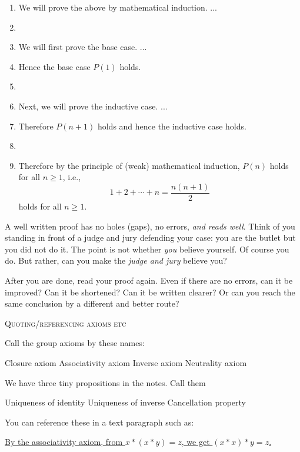\begin{enumerate}[nosep]
\item[] We will prove the above by mathematical induction. ...
\item[]
\item[] \hspace{1cm} We will first prove the base case. ...
\item[] \hspace{1cm} Hence the base case $P(1)$ holds.
\item[]
\item[] \hspace{1cm} Next, we will prove the inductive case. ...
\item[] \hspace{1cm} Therefore $P(n+1)$ holds and hence the inductive case holds.
\item[] 
\item[] Therefore by the principle of (weak) mathematical induction,
$P(n)$ holds for all $n \geq 1$, i.e.,
\[
1 + 2 + \cdots + n = \frac{n(n+1)}{2}
\]
holds for all $n \geq 1$.
\end{enumerate}

A well written proof has no holes (gaps), no errors, \textit{and reads
well}.
Think of you standing in front of a judge and jury defending your case:
you are the butlet but you did not do it.
The point is not whether \textit{you} believe yourself.
Of course you do.
But rather, can you make the \textit{judge and jury} believe you?

After you are done, read your proof again.
Even if there are no errors, can it be improved?
Can it be shortened?
Can it be written clearer?
Or can you reach the same conclusion by a different and better route?

\newpage\textsc{Quoting/referencing axioms etc}

Call the group axioms by these names:
\begin{enumerate}[nosep]
\li Closure axiom
\li Associativity axiom
\li Inverse axiom
\li Neutrality axiom
\end{enumerate}
We have three tiny propositions in the notes.
Call them
\begin{enumerate}[nosep]
\li Uniqueness of identity
\li Uniqueness of inverse
\li Cancellation property
\end{enumerate}
You can reference these in a text paragraph such as:

\underline{By the associativity axiom, from $x * (x * y) = z$, we get
$(x * x)* y = z$.}              

